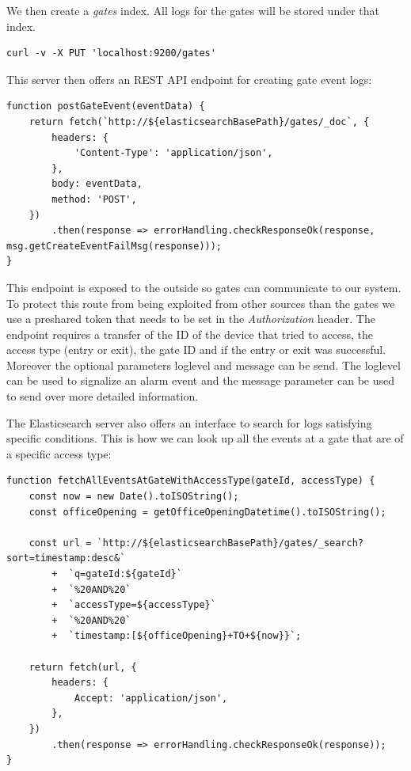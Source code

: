We then create a \emph{gates} index. All logs for the gates will be stored under that index.

\begin{lstlisting}[label=curlScriptElastic]
curl -v -X PUT 'localhost:9200/gates'
\end{lstlisting}

This server then offers an REST API endpoint for creating gate event logs:
\begin{lstlisting}[label=searchElasticPOST]
function postGateEvent(eventData) {
    return fetch(`http://${elasticsearchBasePath}/gates/_doc`, {
        headers: {
            'Content-Type': 'application/json',
        },
        body: eventData,
        method: 'POST',
    })
        .then(response => errorHandling.checkResponseOk(response, msg.getCreateEventFailMsg(response)));
}
\end{lstlisting}

This endpoint is exposed to the outside so gates can communicate to our system. To protect this route from being exploited from other sources than the gates we use a preshared token that needs to be set in the \emph{Authorization} header.
 The endpoint requires a transfer of the ID of the device that tried to access, the access type (entry or exit), the gate ID and if the entry or exit was successful. Moreover the optional parameters loglevel and message can be send. The loglevel can be used to signalize an alarm event and the message parameter can be used to send over more detailed information.

The Elasticsearch server also offers an interface to search for logs satisfying specific conditions. This is how we can look up all the events at a gate that are of a specific access type:

\begin{lstlisting}[label=searchElasticGET]
function fetchAllEventsAtGateWithAccessType(gateId, accessType) {
    const now = new Date().toISOString();
    const officeOpening = getOfficeOpeningDatetime().toISOString();

    const url = `http://${elasticsearchBasePath}/gates/_search?sort=timestamp:desc&`
        +  `q=gateId:${gateId}`
        +  `%20AND%20`
        +  `accessType=${accessType}`
        +  `%20AND%20`
        +  `timestamp:[${officeOpening}+TO+${now}}`;
        
    return fetch(url, {
        headers: {
            Accept: 'application/json',
        },
    })
        .then(response => errorHandling.checkResponseOk(response));
}
\end{lstlisting}

